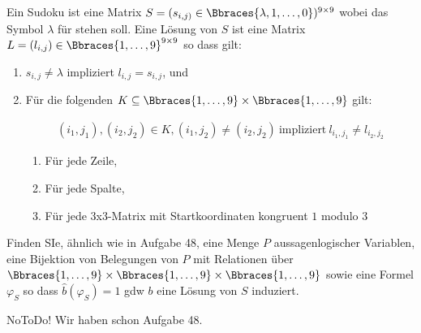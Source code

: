 
\begin{exercise}[49]

Ein Sudoku ist eine Matrix $S = (s_{i, j)} \in \Bbraces{\lambda, 1, \dots, 0})^{9 \times 9}$ wobei das Symbol $\lambda$ für  stehen soll.
Eine Lösung von $S$ ist eine Matrix $L = (l_{i, j}) \in \Bbraces{1, \dots, 9}^{9 \times 9}$ so dass gilt:

\begin{enumerate}[label = \arabic*.]

    \item $s_{i, j} \neq \lambda$ impliziert $l_{i, j} = s_{i, j}$, und
    
    \item Für die folgenden $K \subseteq \Bbraces{1, \dots, 9} \times \Bbraces{1, \dots, 9}$ gilt:
    
    \begin{align*}
        (i_1, j_1), (i_2, j_2) \in K,
        (i_1, j_2) \neq (i_2, j_2)
        ~\text{impliziert}~
        l_{i_1, j_1} \neq l_{i_2, j_2}
    \end{align*}

    \begin{enumerate}
        \item Für jede Zeile,
        \item Für jede Spalte,
        \item Für jede 3x3-Matrix mit Startkoordinaten kongruent $1$ modulo $3$
    \end{enumerate}

\end{enumerate}

Finden SIe, ähnlich wie in Aufgabe 48, eine Menge $P$ aussagenlogischer Variablen, eine Bijektion von Belegungen von $P$ mit Relationen über $\Bbraces{1, \dots, 9} \times \Bbraces{1, \dots, 9} \times \Bbraces{1, \dots, 9}$ sowie eine Formel $\varphi_S$ so dass $\hat{b}(\varphi_S) = 1$ gdw $b$ eine Lösung von $S$ induziert.

\end{exercise}


\begin{solution}

NoToDo!
Wir haben schon Aufgabe 48.

\end{solution}

